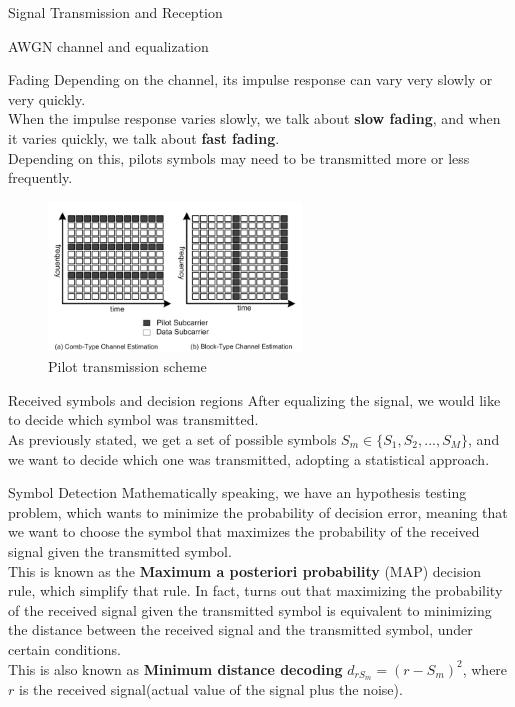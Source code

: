 \begin{section}{Signal Transmission and Reception}
\begin{subsection}{AWGN channel and equalization}
    \begin{subsubsection}{Fading}
      Depending on the channel, its impulse response can vary very slowly or very quickly.\\
      When the impulse response varies slowly, we talk about \textbf{slow fading}, and when it
      varies quickly, we talk about \textbf{fast fading}.\\
      Depending on this, pilots symbols may need to be transmitted more or less frequently.\\
      \begin{figure}[h]
        \centering
        \includegraphics[width=0.6\textwidth]{img/wireless/pilot transmission scheme.png}
        \caption{Pilot transmission scheme}
        \label{fig:pilot transmission}
      \end{figure}
    \end{subsubsection}
  \end{subsection}
  \begin{subsection}{Received symbols and decision regions}
    After equalizing the signal, we would like to decide which symbol was transmitted.\\
    As previously stated, we get a set of possible symbols $S_m\in\{S_1,S_2,...,S_M\}$, and we
    want to decide which one was transmitted, adopting a statistical approach.\\
    \begin{subsubsection}{Symbol Detection}
      Mathematically speaking, we have an hypothesis testing problem, which wants to minimize the
      probability of decision error, meaning that we want to choose the symbol that maximizes the
      probability of the received signal given the transmitted symbol.\\
      
      This is known as the \textbf{Maximum a posteriori probability} (MAP) decision rule, which
      simplify that rule. In fact, turns out that maximizing the probability of the received signal
      given the transmitted symbol is equivalent to minimizing the distance between the received
      signal and the transmitted symbol, under certain conditions.\\
      This is also known as \textbf{Minimum distance decoding} $d_{rS_m}=(r-S_m)^2$, where $r$ is the
      received signal(actual value of the signal plus the noise).\\


\end{subsubsection}
\end{subsection}
\end{section}
